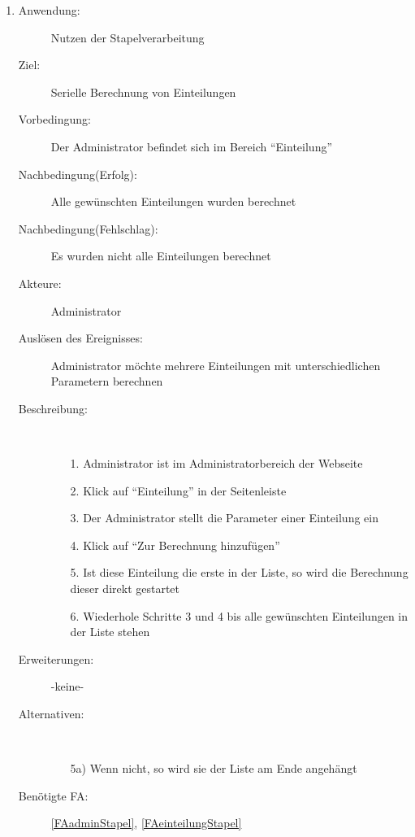 \documentclass[parskip=full]{scrartcl}
\newcommand{\swtLabel}[1]{\textbf{/#1\arabic*0/}}
\begin{document}
\begin{enumerate} [label=\swtLabel{A}]
  \item \label{UCadminStapelverarbeitung}
    \begin{description}
  	\item[Anwendung:] Nutzen der Stapelverarbeitung
  	\item[Ziel:] Serielle Berechnung von Einteilungen
  	\item[Vorbedingung:] Der Administrator befindet sich im Bereich
  	\enquote{Einteilung}
  	\item[Nachbedingung(Erfolg):] Alle gewünschten Einteilungen wurden berechnet
  	\item[Nachbedingung(Fehlschlag):] Es wurden nicht alle Einteilungen berechnet
  	\item[Akteure:] Administrator
  	\item[Auslösen des Ereignisses:] Administrator möchte mehrere Einteilungen
  	mit unterschiedlichen Parametern berechnen
  	\item[Beschreibung:]~
  	\begin{enumerate}
  	  \item[1.] Administrator ist im Administratorbereich der Webseite
      \item[2.] Klick auf \enquote{Einteilung} in der Seitenleiste
      \item[3.] Der Administrator stellt die Parameter einer Einteilung ein
      \item[4.] Klick auf \enquote{Zur Berechnung hinzufügen}
      \item[5.] Ist diese Einteilung die erste in der Liste, so wird die
      Berechnung dieser direkt gestartet
      \item[6.] Wiederhole Schritte 3 und 4 bis alle gewünschten Einteilungen in
      der Liste stehen
  	\end{enumerate}
  	\item[Erweiterungen:] -keine-
  	\item[Alternativen:] ~
  	\begin{enumerate}
  	  \item[5a)] Wenn nicht, so wird sie der Liste am Ende angehängt
  	\end{enumerate}  
  	\item[Benötigte FA:] \ref{FAadminStapel}, \ref{FAeinteilungStapel}
  \end{description}
  

\end{enumerate}
\end{document}
